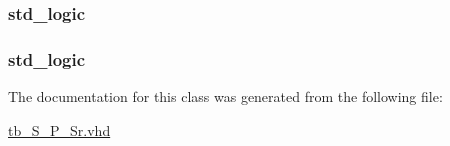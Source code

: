 \subsubsection[{\texorpdfstring{stop\+\_\+point}{stop_point}}]{ {\bfseries \textcolor{vhdlchar}{std\+\_\+logic}\textcolor{vhdlchar}{ }} \hspace{0.3cm}{\ttfamily [Signal]}}\hypertarget{classtb___s___p___sr_1_1behavioral_abfe2b31e1914cd8da7dd38be3abb344f}{}\label{classtb___s___p___sr_1_1behavioral_abfe2b31e1914cd8da7dd38be3abb344f}
\subsubsection[{\texorpdfstring{writing\+\_\+point}{writing_point}}]{ {\bfseries \textcolor{vhdlchar}{std\+\_\+logic}\textcolor{vhdlchar}{ }} \hspace{0.3cm}{\ttfamily [Signal]}}\hypertarget{classtb___s___p___sr_1_1behavioral_ac7b5210640dbfa1943d314abf5bd97f7}{}\label{classtb___s___p___sr_1_1behavioral_ac7b5210640dbfa1943d314abf5bd97f7}


The documentation for this class was generated from the following file\+:\begin{DoxyCompactItemize}
\item 
\hyperlink{tb___s___p___sr_8vhd}{tb\+\_\+\+S\+\_\+\+P\+\_\+\+Sr.\+vhd}\end{DoxyCompactItemize}
